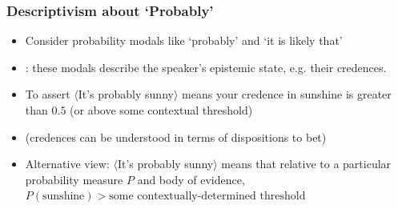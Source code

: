 \begin{frame}
\frametitle{Descriptivism about `Probably'}

\begin{itemize}[<+->]

\item Consider probability modals like `probably' and `it is likely that'

\item {}: these modals describe the speaker's epistemic state, e.g. their credences. 

\item To assert $\langle$It's probably sunny$\rangle$ means your credence in sunshine is greater than $0.5$ (or above some contextual threshold)
\item[] (credences can be understood in terms of dispositions to bet)

\item Alternative view: $\langle$It's probably sunny$\rangle$ means that relative to a particular probability measure $P$ and body of evidence, $P(\text{sunshine}) > \text{some contextually-determined threshold}$


\end{itemize}
\end{frame}

